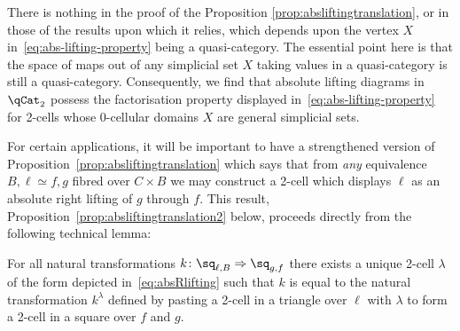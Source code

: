 \begin{rmk}
There is nothing in the proof of the Proposition \ref{prop:absliftingtranslation}, or in those of the results upon which it relies, which depends upon the vertex $X$ in~\eqref{eq:abs-lifting-property} being a quasi-category. The essential point here is that the space of maps out of any simplicial set $X$ taking values in a quasi-category is still a quasi-category. Consequently, we find that absolute lifting diagrams in $\qCat_2$ possess the factorisation property displayed in~\eqref{eq:abs-lifting-property} for 2-cells whose 0-cellular domains $X$ are general simplicial sets.  
\end{rmk}

For certain applications, it will be important to have a strengthened version of Proposition~\ref{prop:absliftingtranslation} which says that from {\em any\/} equivalence $B\comma \ell \simeq f \comma g$ fibred over $C\times B$ we may construct a 2-cell which displays $\ell$ as an absolute right lifting of $g$ through $f$. This result, Proposition~\ref{prop:absliftingtranslation2} below, proceeds directly from the following technical lemma:

\begin{lem}\label{lem:represented-nat-trans}
  For all natural transformations $k\colon\sq_{\ell,B}\Rightarrow\sq_{g,f}$ there exists a unique 2-cell $\lambda$ of the form depicted in~\eqref{eq:absRlifting} such that $k$ is equal to the natural transformation $k^\lambda$ defined by pasting a 2-cell in a triangle over $\ell$ with $\lambda$ to form a 2-cell in a square over $f$ and $g$.
\end{lem}

